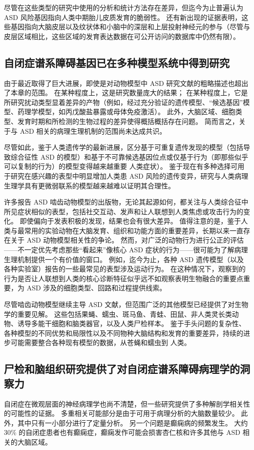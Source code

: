 尽管在这些类型的研究中使用的分析和统计方法存在差异，但迄今为止普遍认为 ASD 风险基因指向人类中期胎儿皮质发育的脆弱性。 还有新出现的证据表明，这些基因指向大脑皮层以及纹状体和小脑中的深层和上层投射神经元的参与（尽管与皮层区域相比，这些区域的发育表达数据在可公开访问的数据库中仍然有限）。

\subsection{自闭症谱系障碍基因已在多种模型系统中得到研究}
由于最近取得了巨大进展，即使是对动物模型中 ASD 研究文献的粗略描述也超出了本章的范围。 在某种程度上，这是研究数量庞大的结果； 在某种程度上，它是所研究扰动类型显着差异的产物（例如，经过充分验证的遗传模型、“候选基因”模型、药理学模型，如丙戊酸盐暴露或母体免疫激活）。 此外，大脑区域、细胞类型、发育时期和所检测的生物过程的差异使得概括概括存在问题。 简而言之，关于与 ASD 相关的病理生理机制的范围尚未达成共识。

尽管如此，鉴于人类遗传学的最新进展，区分基于可重复遗传发现的模型（包括导致综合征性 ASD 的模型）和基于不可靠候选基因位点或仅基于行为（即那些似乎可以复制的行为）的模型变得越来越重要 人类症状）。 鉴于现在有多种选择可用于研究在感兴趣的表型中明显增加人类患 ASD 风险的遗传变异，研究与人类病理生理学具有更微弱联系的模型越来越难以证明其合理性。

许多报告 ASD 啮齿动物模型的出版物，无论其起源如何，都关注与人类综合征中所见症状相似的表型，包括社交互动、发声和让人联想到人类焦虑或攻击行为的变化。 即使偏向于发表积极的发现，结果也会有很大差异。 值得注意的是，鉴于人类与最常用的实验动物在大脑发育、组织和功能方面的重要差异，长期以来一直存在关于 ASD 动物模型相关性的争论。 然而，对广泛的动物行为进行公正的评估——不一定优先考虑那些“看起来”像核心 ASD 症状的行为——很可能为了解病理生理机制提供一个有价值的窗口。 例如，迄今为止，各种 ASD 遗传模型（以及各种实验室）报告的一些最常见的表型涉及运动行为。 在这种情况下，观察到的行为是否让人联想到人类的核心诊断特征似乎远不如观察表明生物融合的重要点重要，为 ASD 涉及的细胞类型、回路和过程提供线索。

尽管啮齿动物模型继续主导 ASD 文献，但范围广泛的其他模型已经提供了对生物学的重要见解。 这些包括果蝇、蠕虫、斑马鱼、青蛙、田鼠、非人类灵长类动物、诱导多能干细胞和脑类器官，以及人类尸检样本。 鉴于手头问题的复杂性、各种模型的不同优势和局限性以及不同物种大脑结构和发育的重要差异，持续的进步可能需要整合各种现有模型的数据，从苍蝇和蠕虫到 人类。

\subsection{尸检和脑组织研究提供了对自闭症谱系障碍病理学的洞察力}
自闭症在微观层面的神经病理学也尚不清楚，但一些研究提供了多种解剖学相关性的可能性的证据。 多重相关可能部分是由于可用于病理分析的大脑数量较少。 此外，其中只有一小部分进行了定量分析。 另一个问题是癫痫病的频繁发生。 大约 30\% 的自闭症患者也有癫痫症，癫痫发作可能会损害杏仁核和许多其他与 ASD 相关的大脑区域。

